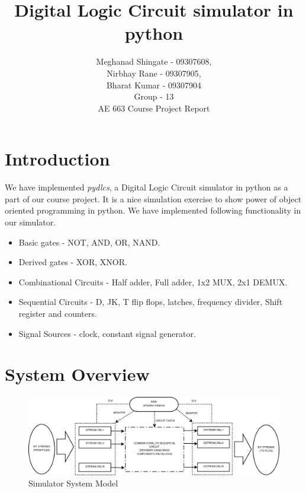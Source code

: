 \documentclass[a4paper,12pt]{article}
\title{Digital Logic Circuit simulator in python}
\author{Meghanad Shingate - 09307608,\\ Nirbhay Rane - 09307905,\\ Bharat Kumar - 09307904\\ Group - 13 \\ [10pt] AE 663 Course Project Report}
\date{}
\begin{document}
\maketitle


\section{Introduction}

We have implemented  \textit{pydlcs},  a  Digital Logic Circuit simulator in python as a part of our course project. It is a nice simulation exercise to show power 
of object oriented programming in python. We have implemented following functionality in our simulator.

\begin{itemize}
 \item Basic gates - NOT, AND, OR, NAND.
\item Derived gates - XOR, XNOR.
\item Combinational Circuits - Half adder, Full adder, 1x2 MUX, 2x1 DEMUX.
\item Sequential Circuits - D, JK, T flip flops, latches, frequency divider, Shift register and counters.
\item Signal Sources -  clock, constant signal generator.
\end{itemize}

  
\section{System Overview}

 

\begin{figure}[h]
   \begin{center}
   \includegraphics[scale=0.25]{syst_model.png}
    \caption{{Simulator System Model}}
  \label{syst_model}
  \end{center}
  \end{figure}
\end{document}
